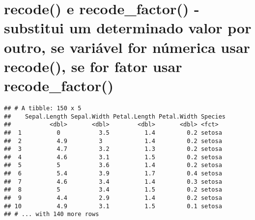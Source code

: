 \documentclass[]{book}
\newenvironment{Shaded}{\begin{snugshade}}{\end{snugshade}}
\newcommand{\DataTypeTok}[1]{\textcolor[rgb]{0.13,0.29,0.53}{#1}}
\newcommand{\DecValTok}[1]{\textcolor[rgb]{0.00,0.00,0.81}{#1}}
\newcommand{\KeywordTok}[1]{\textcolor[rgb]{0.13,0.29,0.53}{\textbf{#1}}}
\newcommand{\NormalTok}[1]{#1}
\newcommand{\OperatorTok}[1]{\textcolor[rgb]{0.81,0.36,0.00}{\textbf{#1}}}
\newcommand{\StringTok}[1]{\textcolor[rgb]{0.31,0.60,0.02}{#1}}
\begin{document}
\hypertarget{recode-e-recode_factor---substitui-um-determinado-valor-por-outro-se-variuxe1vel-for-nuxfamerica-usar-recode-se-for-fator-usar-recode_factor}{%
\section{recode() e recode\_factor() - substitui um determinado valor por outro, se variável for númerica usar recode(), se for fator usar recode\_factor()}\label{recode-e-recode_factor---substitui-um-determinado-valor-por-outro-se-variuxe1vel-for-nuxfamerica-usar-recode-se-for-fator-usar-recode_factor}}

\begin{Shaded}
\end{Shaded}

\begin{verbatim}
## # A tibble: 150 x 5
##    Sepal.Length Sepal.Width Petal.Length Petal.Width Species
##           <dbl>       <dbl>        <dbl>       <dbl> <fct>  
##  1          0           3.5          1.4         0.2 setosa 
##  2          4.9         3            1.4         0.2 setosa 
##  3          4.7         3.2          1.3         0.2 setosa 
##  4          4.6         3.1          1.5         0.2 setosa 
##  5          5           3.6          1.4         0.2 setosa 
##  6          5.4         3.9          1.7         0.4 setosa 
##  7          4.6         3.4          1.4         0.3 setosa 
##  8          5           3.4          1.5         0.2 setosa 
##  9          4.4         2.9          1.4         0.2 setosa 
## 10          4.9         3.1          1.5         0.1 setosa 
## # ... with 140 more rows
\end{verbatim}

\begin{Shaded}
\end{Shaded}
\end{document}
